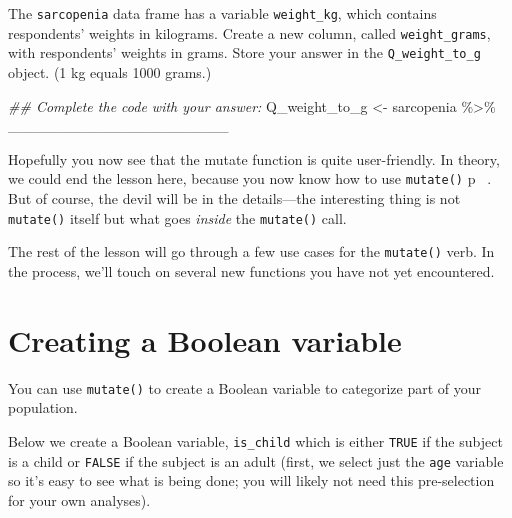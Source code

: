 \documentclass[
  letterpaper,
  DIV=11,
  numbers=noendperiod]{scrreprt}
\newenvironment{Shaded}{\begin{snugshade}}{\end{snugshade}}
\newcommand{\DocumentationTok}[1]{\textcolor[rgb]{0.37,0.37,0.37}{\textit{#1}}}
\newcommand{\NormalTok}[1]{\textcolor[rgb]{0.00,0.23,0.31}{#1}}
\newcommand{\OtherTok}[1]{\textcolor[rgb]{0.00,0.23,0.31}{#1}}
\newcommand{\SpecialCharTok}[1]{\textcolor[rgb]{0.37,0.37,0.37}{#1}}
\begin{document}
\begin{tcolorbox}[enhanced jigsaw, titlerule=0mm, colback=white, left=2mm, breakable, opacitybacktitle=0.6, colbacktitle=quarto-callout-tip-color!10!white, colframe=quarto-callout-tip-color-frame, bottomtitle=1mm, opacityback=0, coltitle=black, arc=.35mm, toptitle=1mm, title=\textcolor{quarto-callout-tip-color}{\faLightbulb}\hspace{0.5em}{Practice}, leftrule=.75mm, toprule=.15mm, bottomrule=.15mm, rightrule=.15mm]

The \texttt{sarcopenia} data frame has a variable \texttt{weight\_kg},
which contains respondents' weights in kilograms. Create a new column,
called \texttt{weight\_grams}, with respondents' weights in grams. Store
your answer in the \texttt{Q\_weight\_to\_g} object. (1 kg equals 1000
grams.)

\begin{Shaded}
\begin{Highlighting}[]
\DocumentationTok{\#\# Complete the code with your answer:}
\NormalTok{Q\_weight\_to\_g }\OtherTok{\textless{}{-}} 
\NormalTok{  sarcopenia }\SpecialCharTok{\%\textgreater{}\%} 
\NormalTok{  \_\_\_\_\_\_\_\_\_\_\_\_\_\_\_\_\_\_\_\_\_}
\end{Highlighting}
\end{Shaded}

\end{tcolorbox}

Hopefully you now see that the mutate function is quite user-friendly.
In theory, we could end the lesson here, because you now know how to use
\texttt{mutate()} p. But of course, the devil will be in the
details---the interesting thing is not \texttt{mutate()} itself but what
goes \emph{inside} the \texttt{mutate()} call.

The rest of the lesson will go through a few use cases for the
\texttt{mutate()} verb. In the process, we'll touch on several new
functions you have not yet encountered.

\section{Creating a Boolean variable}\label{creating-a-boolean-variable}

You can use \texttt{mutate()} to create a Boolean variable to categorize
part of your population.

Below we create a Boolean variable, \texttt{is\_child} which is either
\texttt{TRUE} if the subject is a child or \texttt{FALSE} if the subject
is an adult (first, we select just the \texttt{age} variable so it's
easy to see what is being done; you will likely not need this
pre-selection for your own analyses).
\end{document}
